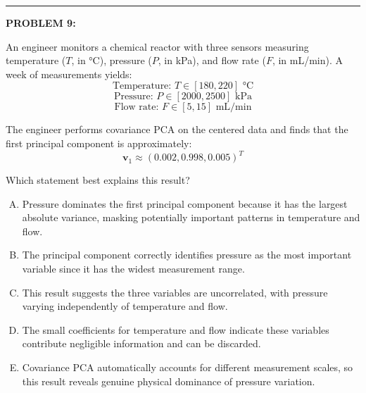 \documentclass[12pt]{amsart}
\newcommand{\divider}{
  \vspace{-1em} %
  \noindent
  \raisebox{-0.15ex}{\textbullet}%
  \hspace{0.5em}%
  \rule[0.5ex]{0.95\textwidth}{1.0pt}%
  \hspace{0.5em}%
  \raisebox{-0.15ex}{\textbullet}%
  \vspace{0em} %
}
\begin{document}

\divider


{\bf PROBLEM 9:}

An engineer monitors a chemical reactor with three sensors measuring temperature ($T$, in °C), pressure ($P$, in kPa), and flow rate ($F$, in mL/min). A week of measurements yields:
%
$$\text{Temperature: } T \in [180, 220] \text{ °C}$$
$$\text{Pressure: } P \in [2000, 2500] \text{ kPa}$$
$$\text{Flow rate: } F \in [5, 15] \text{ mL/min}$$

The engineer performs covariance PCA on the centered data and finds that the first principal component is approximately:
$$\mathbf{v}_1 \approx (0.002, 0.998, 0.005)^T$$

Which statement best explains this result?

\begin{enumerate}[(A)]
\item Pressure dominates the first principal component because it has the largest absolute variance, masking potentially important patterns in temperature and flow.
\item The principal component correctly identifies pressure as the most important variable since it has the widest measurement range.
\item This result suggests the three variables are uncorrelated, with pressure varying independently of temperature and flow.
\item The small coefficients for temperature and flow indicate these variables contribute negligible information and can be discarded.
\item Covariance PCA automatically accounts for different measurement scales, so this result reveals genuine physical dominance of pressure variation.
\end{enumerate}
\end{document}
